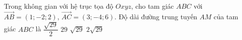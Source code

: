 \begin{ex}%
	Trong không gian với hệ trục tọa độ $Oxyz$, cho tam giác $ABC$ với $\vec{AB} =(1;-2;2)$, $\vec{AC} =(3;-4;6)$. Độ dài đường trung tuyến $AM$ của tam giác $ABC$ là \choice 
	{$\dfrac{\sqrt{29}}{2}$}
	{$29$}
	{\True $\sqrt{29}$}
	{$2\sqrt{29}$}
	
\end{ex}

